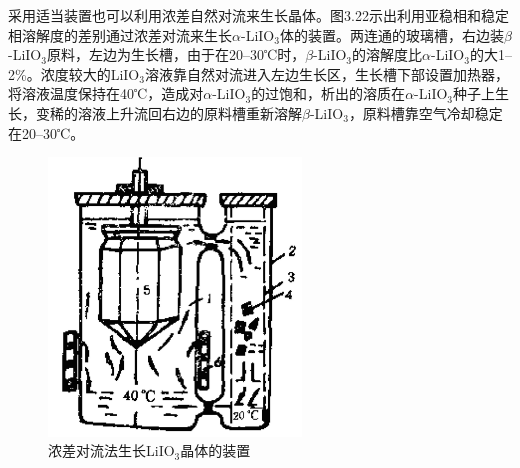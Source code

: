 采用适当装置也可以利用浓差自然对流来生长晶体。图3.22示出利用亚稳相和稳定相溶解度的差别通过浓差对流来生长$\alpha$-LiIO$_3$体的装置。两连通的玻璃槽，右边装$\beta$-LiIO$_3$原料，左边为生长槽，由于在20--30℃时，$\beta$-LiIO$_3$的溶解度比$\alpha$-LiIO$_3$的大1--2\%。浓度较大的LiIO$_3$溶液靠自然对流进入左边生长区，生长槽下部设置加热器，将溶液温度保持在40℃，造成对$\alpha$-LiIO$_3$的过饱和，析出的溶质在$\alpha$-LiIO$_3$种子上生长，变稀的溶液上升流回右边的原料槽重新溶解$\beta$-LiIO$_3$，原料槽靠空气冷却稳定在20--30℃。
\begin{figure}[h]
 \centering
 \includegraphics[width=0.6\textwidth]{fig/cp03/img3.22.jpg}
 \caption{浓差对流法生长LiIO$_3$晶体的装置}
\end{figure}